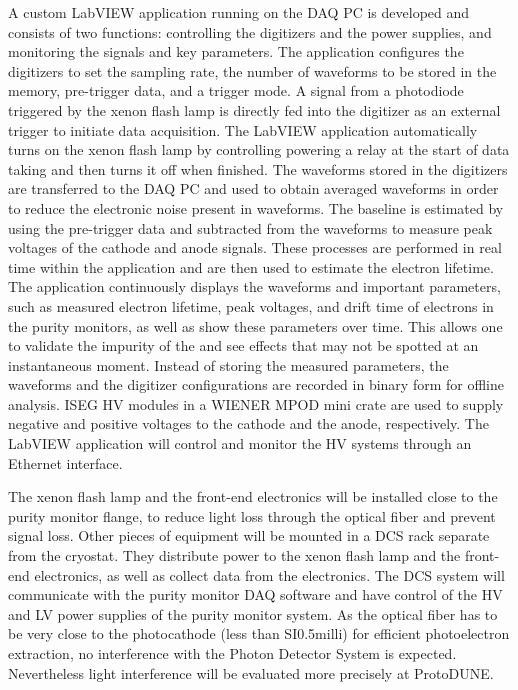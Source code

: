 A custom LabVIEW application running on the DAQ PC is developed and consists of two functions: controlling the digitizers and the power supplies, and monitoring the signals and key parameters. The application configures the digitizers to set the sampling rate, the number of waveforms to be stored in the memory, pre-trigger data, and a trigger mode. A signal from a photodiode triggered by the xenon flash lamp is directly fed into the digitizer as an external trigger to initiate data acquisition. The LabVIEW application automatically turns on the xenon flash lamp by controlling powering a relay at the start of data taking and then turns it off when finished. The waveforms stored in the digitizers are transferred to the DAQ PC and used to obtain averaged waveforms in order to reduce the electronic noise present in waveforms. The baseline is estimated by using the pre-trigger data and subtracted from the waveforms to measure peak voltages of the cathode and anode signals. These processes are performed in real time within the application and are then used to estimate the electron lifetime. The application continuously displays the waveforms and important parameters, such as measured electron lifetime, peak voltages, and drift time of electrons in the purity monitors, as well as show these parameters over time. This allows one to validate the impurity of the  and see effects that may not be spotted at an instantaneous moment. Instead of storing the measured parameters, the waveforms and the digitizer configurations are recorded in binary form for offline analysis. ISEG HV modules in a WIENER MPOD mini crate are used to supply negative and positive voltages to the cathode and the anode, respectively. The LabVIEW application will control and monitor the HV systems through an Ethernet interface.  

The xenon flash lamp and the front-end electronics will be installed close to the purity monitor flange, to reduce light loss through the optical fiber and prevent signal loss. Other pieces of equipment will be mounted in a DCS rack separate from the cryostat. They distribute power to the xenon flash lamp and the front-end electronics, as well as collect data from the electronics. The DCS system will communicate with the purity monitor DAQ software and have control of the HV and LV power supplies of the purity monitor system. 
As the optical fiber has to be very close to the photocathode (less than SI{0.5}{milli\meter}) for efficient photoelectron extraction, no interference with the Photon Detector System is expected. Nevertheless light interference will be evaluated more precisely at ProtoDUNE. 

